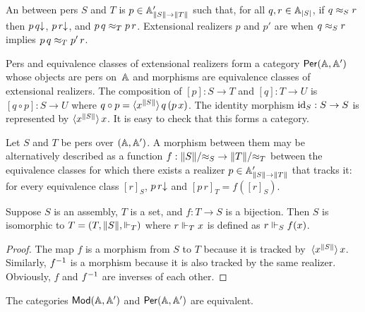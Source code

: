 An  between pers $S$ and $T$ is $p \in
\subAtyp{\T{S} \to \T{T}}$ such that, for all $q, r \in \xAtyp{S}$, if $q
\per_S r$ then $\defined{p\,q}$, $\defined{p\,r}$, and $p\,q \per_T
p\,r$. Extensional realizers $p$ and $p'$ are  when
$q \per_S r$ implies $p\,q \per_T p'\,r$.

Pers and equivalence classes of extensional realizers form a category
$\Per{\AA, \subAA}$ whose objects are pers on~$\AA$ and morphisms are
equivalence classes of extensional realizers. The composition of $[p]
: S \to T$ and $[q] : T \to U$ is $[q \circ p] : S \to U$ where $q
\circ p = \tpcalam{x}{\T{S}}{q\,(p\,x)}$. The identity morphism
$\id[S] : S \to S$ is represented by $\tpcalam{x}{\T{S}} x$. It
is easy to check that this forms a category.

Let $S$ and $T$ be pers over $(\AA, \subAA)$. A morphism between them
may be alternatively described as a function $f : \|S\|/{\per_S} \to
\|T\|/{\per_T}$ between the equivalence classes for which there exists
a realizer $p \in \subAtyp{\T{S} \to \T{T}}$ that tracks it: for every
equivalence class $[r]_S$, $\defined{p\,r}$ and $[p\,r]_T = f([r]_S)$.

\begin{lemma}
  \label{lemma:iso-assembly}
  Suppose $S$ is an assembly, $T$ is a set, and $f : T \to S$ is
  a bijection. Then $S$ is isomorphic to $T = (T, \T{S},
  {\rz[T]})$ where $r \rz[T] x$ is defined as $r \rz[S] f(x)$.
\end{lemma}


\begin{proof}
  The map $f$ is a morphism from $S$ to $T$ because it is
  tracked by~$\tpcalam{x}{\T{S}}{x}$. Similarly, $\inv{f}$ is a
  morphism because it is also tracked by the same realizer. Obviously,
  $f$ and $\inv{f}$ are inverses of each other.
\end{proof}


\begin{proposition}
  The categories $\Mod{\AA, \subAA}$ and $\Per{\AA, \subAA}$ are
  equivalent.
\end{proposition}

